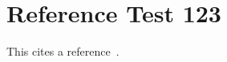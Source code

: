 \documentclass{article}
\begin{document}
\section{Reference Test 123}
This cites a reference~\cite{test123}.

\end{document}
